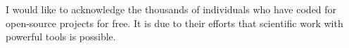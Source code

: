 

\begin{acknowledgements}      %

I would like to acknowledge the thousands of individuals who have coded for open-source projects for free. It is due to their efforts that 
scientific work with powerful tools is possible.


\end{acknowledgements}



